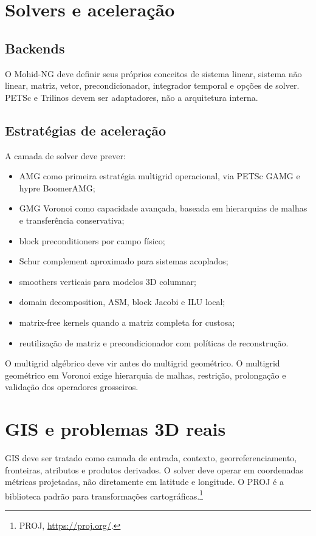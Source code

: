 \documentclass[11pt,a4paper]{article}
\begin{document}
\section{Solvers e acelera\c{c}\~ao}

\subsection{Backends}

O Mohid-NG deve definir seus pr\'oprios conceitos de sistema linear, sistema n\~ao linear, matriz, vetor, precondicionador, integrador temporal e op\c{c}\~oes de solver. PETSc e Trilinos devem ser adaptadores, n\~ao a arquitetura interna.

\subsection{Estrat\'egias de acelera\c{c}\~ao}

A camada de solver deve prever:
\begin{itemize}
  \item AMG como primeira estrat\'egia multigrid operacional, via PETSc GAMG e hypre BoomerAMG;
  \item GMG Voronoi como capacidade avan\c{c}ada, baseada em hierarquias de malhas e transfer\^encia conservativa;
  \item block preconditioners por campo f\'isico;
  \item Schur complement aproximado para sistemas acoplados;
  \item smoothers verticais para modelos 3D columnar;
  \item domain decomposition, ASM, block Jacobi e ILU local;
  \item matrix-free kernels quando a matriz completa for custosa;
  \item reutiliza\c{c}\~ao de matriz e precondicionador com pol\'iticas de reconstru\c{c}\~ao.
\end{itemize}

O multigrid alg\'ebrico deve vir antes do multigrid geom\'etrico. O multigrid geom\'etrico em Voronoi exige hierarquia de malhas, restri\c{c}\~ao, prolonga\c{c}\~ao e valida\c{c}\~ao dos operadores grosseiros.

\section{GIS e problemas 3D reais}

GIS deve ser tratado como camada de entrada, contexto, georreferenciamento, fronteiras, atributos e produtos derivados. O solver deve operar em coordenadas m\'etricas projetadas, n\~ao diretamente em latitude e longitude. O PROJ \'e a biblioteca padr\~ao para transforma\c{c}\~oes cartogr\'aficas.\footnote{PROJ, \url{https://proj.org/}.}
\end{document}
